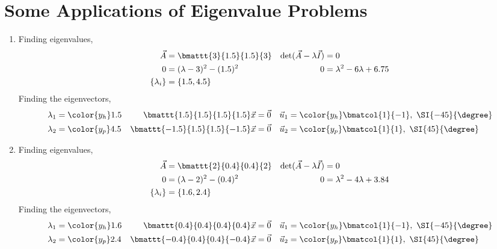 \section{Some Applications of Eigenvalue Problems}

\begin{enumerate}
    \item Finding eigenvalues,
          \begin{align}
              \vec{A}                        & = \bmattt{3}{1.5}{1.5}{3}      &
              \det(\vec{A} - \lambda\vec{I}) & = 0                              \\
              0                              & = (\lambda - 3)^2 - (1.5)^2    &
              0                              & = \lambda^2 - 6 \lambda + 6.75   \\
              \{\lambda_i\}                  & = \{ 1.5, 4.5 \}
          \end{align}
          Finding the eigenvectors,
          \begin{align}
              \lambda_1                             & = \color{y_h} 1.5 &
              \bmattt{1.5}{1.5}{1.5}{1.5} \vec{x}   & = \vec{0}         &
              \vec{u}_1                             & = \color{y_h}
              \bmatcol{1}{-1},\ \SI{-45}{\degree}                         \\
              \lambda_2                             & = \color{y_p} 4.5 &
              \bmattt{-1.5}{1.5}{1.5}{-1.5} \vec{x} & = \vec{0}         &
              \vec{u}_2                             & = \color{y_p}
              \bmatcol{1}{1},\ \SI{45}{\degree}
          \end{align}

    \item Finding eigenvalues,
          \begin{align}
              \vec{A}                        & = \bmattt{2}{0.4}{0.4}{2}      &
              \det(\vec{A} - \lambda\vec{I}) & = 0                              \\
              0                              & = (\lambda - 2)^2 - (0.4)^2    &
              0                              & = \lambda^2 - 4 \lambda + 3.84   \\
              \{\lambda_i\}                  & = \{ 1.6, 2.4 \}
          \end{align}
          Finding the eigenvectors,
          \begin{align}
              \lambda_1                             & = \color{y_h} 1.6 &
              \bmattt{0.4}{0.4}{0.4}{0.4} \vec{x}   & = \vec{0}         &
              \vec{u}_1                             & = \color{y_h}
              \bmatcol{1}{-1},\ \SI{-45}{\degree}                         \\
              \lambda_2                             & = \color{y_p} 2.4 &
              \bmattt{-0.4}{0.4}{0.4}{-0.4} \vec{x} & = \vec{0}         &
              \vec{u}_2                             & = \color{y_p}
              \bmatcol{1}{1},\ \SI{45}{\degree}
          \end{align}


\end{enumerate}
